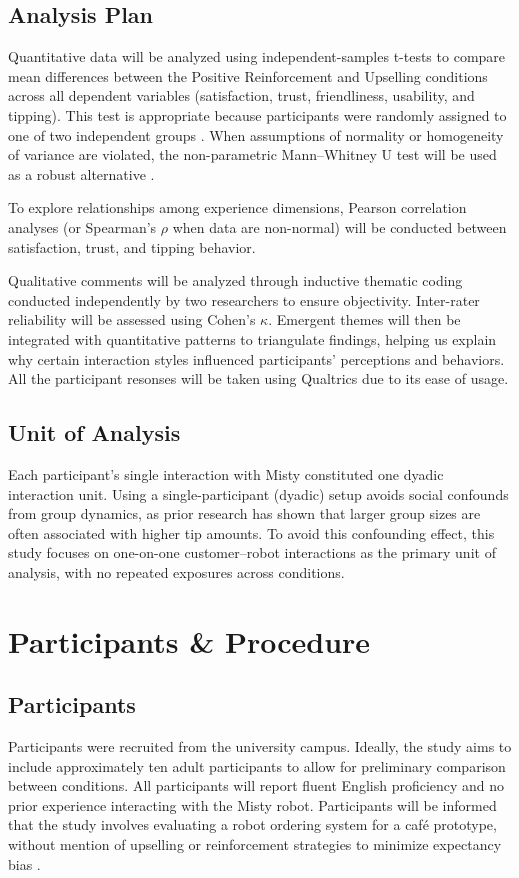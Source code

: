 \documentclass[conference]{IEEEtran}
\begin{document}
\subsection{Analysis Plan}
Quantitative data will be analyzed using independent-samples t-tests to compare mean differences between the Positive Reinforcement and Upselling conditions across all dependent variables (satisfaction, trust, friendliness, usability, and tipping). This test is appropriate because participants were randomly assigned to one of two independent groups \cite{b30}. When assumptions of normality or homogeneity of variance are violated, the non-parametric Mann–Whitney U test will be used as a robust alternative \cite{b31}.

To explore relationships among experience dimensions, Pearson correlation analyses (or Spearman's $\rho$ when data are non-normal) will be conducted between satisfaction, trust, and tipping behavior.

Qualitative comments will be analyzed through inductive thematic coding conducted independently by two researchers to ensure objectivity. Inter-rater reliability will be assessed using Cohen's $\kappa$. Emergent themes will then be integrated with quantitative patterns to triangulate findings, helping us explain why certain interaction styles influenced participants' perceptions and behaviors. All the participant resonses will be taken using Qualtrics due to its ease of usage.

\subsection{Unit of Analysis}
Each participant's single interaction with Misty constituted one dyadic interaction unit. Using a single-participant (dyadic) setup avoids social confounds from group dynamics, as prior research has shown that larger group sizes are often associated with higher tip amounts\cite{b33}. To avoid this confounding effect, this study focuses on one-on-one customer–robot interactions as the primary unit of analysis, with no repeated exposures across conditions.

\section{Participants \& Procedure}
\label{sec:participants_procedure}
\subsection{Participants}
Participants were recruited from the university campus. Ideally, the study aims to include approximately ten adult participants to allow for preliminary comparison between conditions. All participants will report fluent English proficiency and no prior experience interacting with the Misty robot. Participants will be informed that the study involves evaluating a robot ordering system for a café prototype, without mention of upselling or reinforcement strategies to minimize expectancy bias \cite{b32}.
\end{document}
